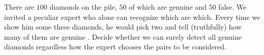 There are $100$ diamonds on the pile, $50$ of which are genuine and $50$ false. We invited a peculiar expert who alone can recognize which are which. Every time we show him some three diamonds, he would pick two and tell (truthfully) how many of them are genuine . Decide whether we can surely detect all genuine diamonds regardless how the expert chooses the pairs to be considered.